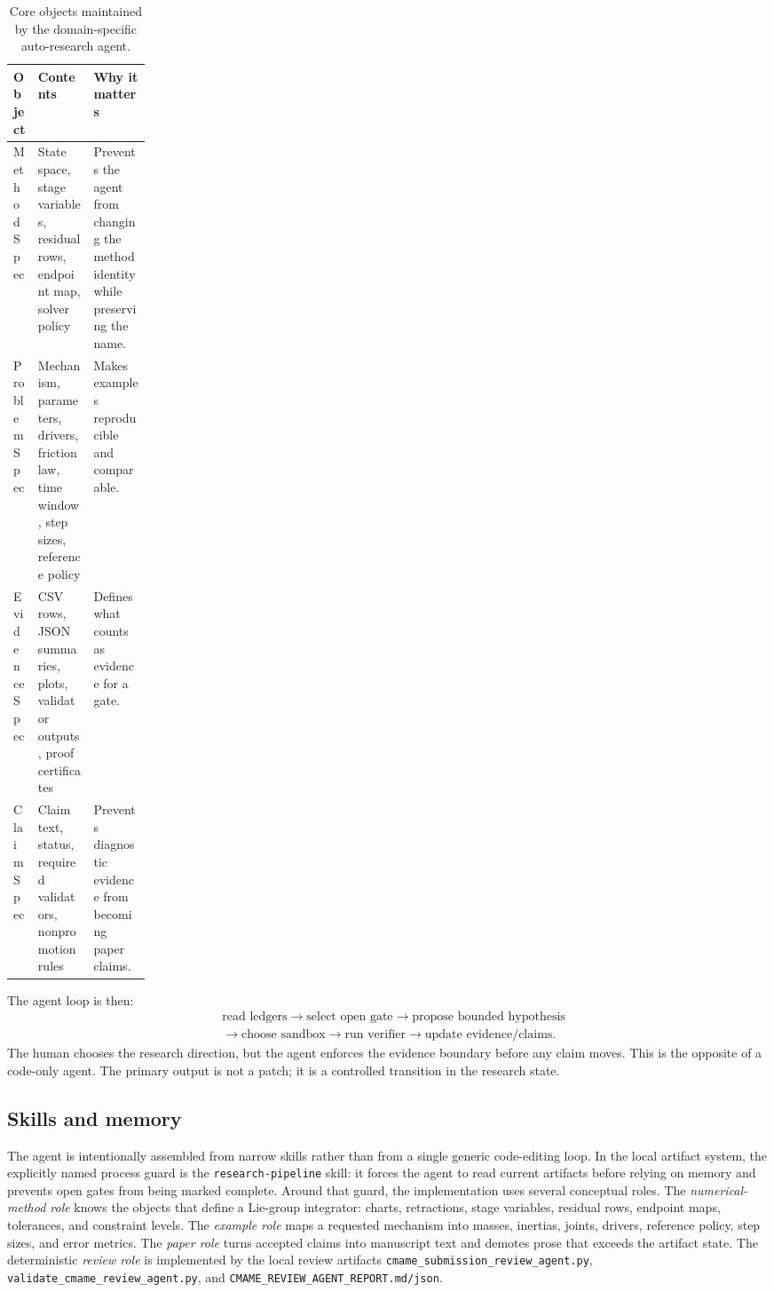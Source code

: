 \documentclass[10pt]{article}
\begin{document}
\begin{table}[H]
\centering
\caption{Core objects maintained by the domain-specific auto-research agent.}
\label{tab:objects}
\begin{tabularx}{\linewidth}{p{0.18\linewidth}YY}
\toprule
\textbf{Object} & \textbf{Contents} & \textbf{Why it matters} \\
\midrule
MethodSpec & State space, stage variables, residual rows, endpoint map, solver policy & Prevents the agent from changing the method identity while preserving the name. \\
ProblemSpec & Mechanism, parameters, drivers, friction law, time window, step sizes, reference policy & Makes examples reproducible and comparable. \\
EvidenceSpec & CSV rows, JSON summaries, plots, validator outputs, proof certificates & Defines what counts as evidence for a gate. \\
ClaimSpec & Claim text, status, required validators, nonpromotion rules & Prevents diagnostic evidence from becoming paper claims. \\
\bottomrule
\end{tabularx}
\end{table}

The agent loop is then:
\[
  \begin{aligned}
  &\text{read ledgers} \rightarrow \text{select open gate}
  \rightarrow \text{propose bounded hypothesis} \\
  &\rightarrow \text{choose sandbox}
  \rightarrow \text{run verifier}
  \rightarrow \text{update evidence/claims}.
  \end{aligned}
\]
The human chooses the research direction, but the agent enforces the evidence
boundary before any claim moves. This is the opposite of a code-only agent. The
primary output is not a patch; it is a controlled transition in the research
state.

\subsection{Skills and memory}

The agent is intentionally assembled from narrow skills rather than from a
single generic code-editing loop. In the local artifact system, the explicitly
named process guard is the \texttt{research-pipeline} skill: it forces the
agent to read current artifacts before relying on memory and prevents open
gates from being marked complete. Around that guard, the implementation uses
several conceptual roles. The \emph{numerical-method role} knows the objects
that define a Lie-group integrator: charts, retractions, stage variables,
residual rows, endpoint maps, tolerances, and constraint levels. The
\emph{example role} maps a requested mechanism into masses, inertias, joints,
drivers, reference policy, step sizes, and error metrics. The \emph{paper
role} turns accepted claims into manuscript text and demotes prose that
exceeds the artifact state. The deterministic \emph{review role} is
implemented by the local review artifacts
\texttt{cmame\_submission\_review\_agent.py},
\texttt{validate\_cmame\_review\_agent.py}, and
\texttt{CMAME\_REVIEW\_AGENT\_REPORT.md/json}.
\end{document}
